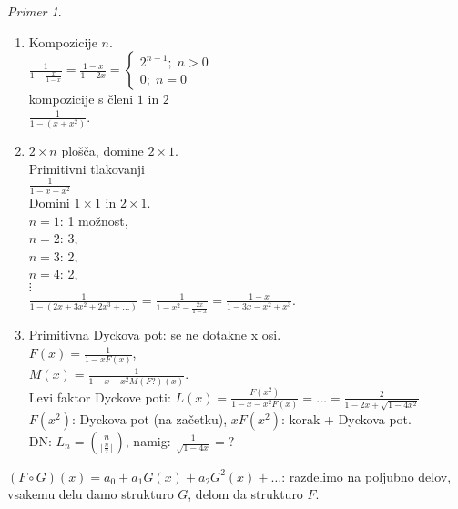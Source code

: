 \documentclass[a4paper, 12pt]{book}
\theoremstyle{definition}
\theoremstyle{remark}
\newtheorem*{ex}{Primer}
\begin{document}
\begin{ex} \text{} \\
  \begin{enumerate}[label=(\arabic*)]
    \item Kompozicije $n$. \\
      $\frac{1}{1-\frac{x}{1-x}} = \frac{1-x}{1-2x} =
      \begin{cases}
        2^{n-1}; \; n > 0 \\
        0; \; n = 0
      \end{cases}$ \\
      kompozicije s členi $1$ in $2$ \\
      $\frac{1}{1-(x+x^2)}$.
    \item $2 \times n$ plošča, domine $2 \times 1$. \\
      Primitivni tlakovanji \\
      $\frac{1}{1-x-x^2}$ \\
      Domini $1 \times 1$ in $2 \times 1$. \\
      $n = 1$: 1 možnost, \\
      $n = 2$: 3, \\
      $n = 3$: 2, \\
      $n = 4$: 2, \\
      $\vdots$ \\
      $\frac{1}{1-(2x + 3x^2 + 2x^3 + \dots)} = \frac{1}{1-x^2-\frac{2x}{1-x}} = \frac{1-x}{1-3x-x^2+x^3}$.
    \item Primitivna Dyckova pot: se ne dotakne x osi. \\
      $F(x) = \frac{1}{1 - x F(x)}$, \\
      $M(x) = \frac{1}{1 - x - x^2 M(F?)(x)}$. \\
      Levi faktor Dyckove poti: %
      $L(x) = \frac{F(x^2)}{1 - x - x^2 F(x)} = \dots = \frac{2}{1 - 2 x + \sqrt{1-4x^2}}$ \\
      $F(x^2)$: Dyckova pot (na začetku), $x F(x^2)$: korak + Dyckova pot. \\
      DN: $L_n = \binom{n}{\lfloor\frac{n}{2}\rfloor}$, namig: $\frac{1}{\sqrt{1-4x}} = ?$
  \end{enumerate}
\end{ex}
$(F \circ G)(x) = a_0 + a_1 G(x) + a_2 G^2(x) + \dots$: razdelimo na poljubno delov, vsakemu delu damo strukturo $G$,
delom da strukturo $F$.
\end{document}
